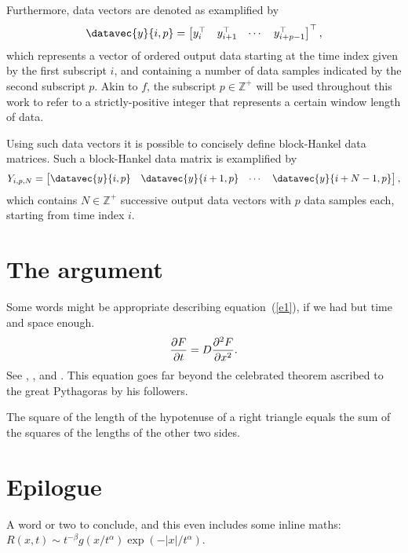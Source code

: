 \documentclass[twocolumn]{autart}    %
\begin{document}
Furthermore, data vectors are denoted as examplified by
\begin{align*}
    \datavec{y}{i,p} = \begin{bmatrix} y_i^\top & y_{i+1}^\top & \cdots & y_{i+p-1}^\top\end{bmatrix}^\top,
\end{align*}
which represents a vector of ordered output data starting at the time index given by the first subscript $i$, and containing a number of data samples indicated by the second subscript $p$. Akin to $f$, the subscript $p\in\mathbb{Z}^+$ will be used throughout this work to refer to a strictly-positive integer that represents a certain window length of data.

Using such data vectors it is possible to concisely define block-Hankel data matrices. Such a block-Hankel data matrix is examplified by
\begin{align*}
    Y_{i,p,N} = \begin{bmatrix}
        \datavec{y}{i,p} & \datavec{y}{i+1,p} & \cdots & \datavec{y}{i+N-1,p}
    \end{bmatrix},
\end{align*}
which contains $N\in\mathbb{Z}^+$ successive output data vectors with $p$ data samples each, starting from time index $i$.

\section{The argument}
Some words might be appropriate describing equation~(\ref{e1}), if 
we had but time and space enough.
\begin{equation} \label{e1}
{{\partial F}\over {\partial t}} =
D{{\partial^2 F}\over {\partial x^2}}.
\end{equation}
See \cite{Abl:56}, \cite{AbTaRu:54}, \cite{Keo:58} and 
\cite{Pow:85}.
This equation goes far beyond the celebrated theorem ascribed to the great
Pythagoras by his followers.
\begin{thm}
The square of the length of the hypotenuse of a right triangle equals the sum of the squares 
of the lengths of the other two sides.
\end{thm}
\section{Epilogue}
A word or two to conclude, and this even includes some inline 
maths:  $R(x,t)\sim t^{-\beta}g(x/t^\alpha)\exp(-|x|/t^\alpha)$.
\end{document}
